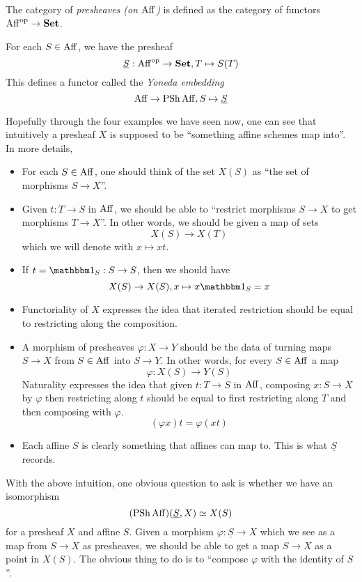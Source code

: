 \documentclass[./main.tex]{subfiles}
\begin{document}
\begin{dfn}
  
  The category of \emph{presheaves (on $\mathrm{Aff}$)} is
  defined as the category of functors $\mathrm{Aff}^{\mathrm{op}} \to \mathbf{Set}$.

  For each $S \in \mathrm{Aff}$,
  we have the presheaf \[
    \underline{S} : \mathrm{Aff}^{\mathrm{op}} \to \mathbf{Set} ,
    T \mapsto S(T)
  \]
  This defines a functor called the \emph{Yoneda embedding}
  \[
    \mathrm{Aff} \to \operatorname{PSh} \mathrm{Aff} , S \mapsto \underline{S}    
  \]
\end{dfn}
Hopefully through the four examples we have seen now,
one can see that intuitively a presheaf $X$ is supposed
to be ``something affine schemes map into''.
In more details,
\begin{itemize}
  \item For each $S \in \mathrm{Aff}$, one should think of
  the set $X(S)$ as ``the set of morphisms $S \to X$''.
  \item Given $t : T \to S$ in $\mathrm{Aff}$,
  we should be able to ``restrict morphisms $S \to X$
  to get morphisms $T \to X$''.
  In other words, we should be given a map of sets 
  \[
    X(S) \to X(T) 
  \]
  which we will denote with $x \mapsto x t$.
  \item If $t = \id_S : S \to S$,
  then we should have \[
    X(S) \to X(S) , x \mapsto x \id_S = x
  \]
  \item Functoriality of $X$ expresses
  the idea that iterated restriction
  should be equal to restricting along the composition.
  \item A morphism of presheaves $\varphi : X \to Y$ should be
  the data of turning maps $S \to X$ from $S \in \mathrm{Aff}$
  into $S \to Y$.
  In other words, for every $S \in \mathrm{Aff}$ a map \[
    \varphi : X(S) \to Y(S)  
  \]
  Naturality expresses the idea that
  given $t : T \to S$ in $\mathrm{Aff}$,
  composing $x : S \to X$ by $\varphi$ then restricting along $t$
  should be equal to first restricting along $T$ and then
  composing with $\varphi$.
  \[
    (\varphi x) t  = \varphi (x t) 
  \]
  \item Each affine $S$ is clearly something
  that affines can map to.
  This is what $\underline{S}$ records.
\end{itemize}
With the above intuition,
one obvious question to ask is whether we have an isomorphism
\[
  (\operatorname{PSh} \mathrm{Aff})(\underline{S} , X) \simeq X(S)
\]
for a presheaf $X$ and affine $S$.
Given a morphism $\varphi : \underline{S} \to X$
which we see as a map from $S \to X$ as presheaves,
we should be able to get a map $S \to X$ as a point in $X(S)$.
The obvious thing to do is to ``compose $\varphi$ with the identity of $S$''.
\end{document}
